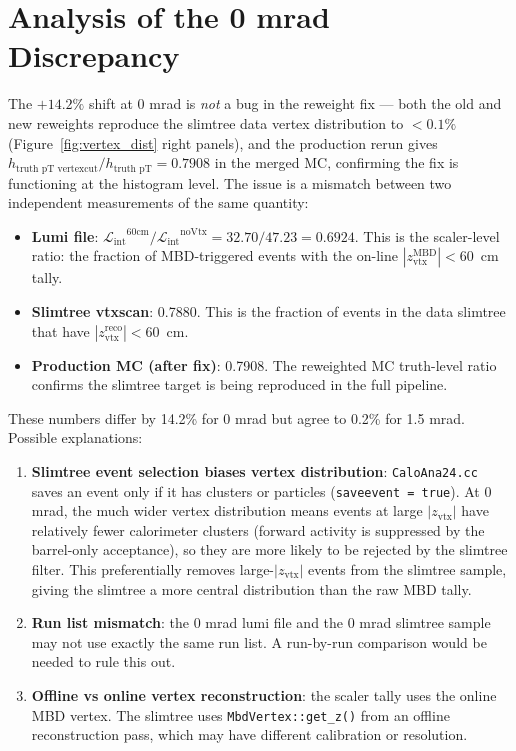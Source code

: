 \documentclass[11pt,letterpaper]{article}
\newcommand{\zvtx}{\ensuremath{z_{\mathrm{vtx}}}}
\newcommand{\Lint}{\ensuremath{\mathcal{L}_{\text{int}}}}
\begin{document}
\section{Analysis of the 0 mrad Discrepancy}
\label{sec:0mrad_discrepancy}

The $+14.2\%$ shift at 0 mrad is \emph{not} a bug in the reweight
fix --- both the old and new reweights reproduce the slimtree data
vertex distribution to $< 0.1\%$ (Figure~\ref{fig:vertex_dist} right
panels), and the production rerun gives
$h_{\text{truth pT vertexcut}}/h_{\text{truth pT}} = 0.7908$ in the
merged MC, confirming the fix is functioning at the histogram level.
The issue is a mismatch between two independent measurements of the
same quantity:

\begin{itemize}
  \item \textbf{Lumi file}: $\Lint^{60\text{cm}} / \Lint^{\text{noVtx}}
    = 32.70 / 47.23 = 0.6924$. This is the scaler-level ratio: the
    fraction of MBD-triggered events with the on-line
    $|z^{\text{MBD}}_{\text{vtx}}| < 60$~cm tally.
  \item \textbf{Slimtree vtxscan}: 0.7880. This is the fraction of
    events in the data slimtree that have
    $|z^{\text{reco}}_{\text{vtx}}| < 60$~cm.
  \item \textbf{Production MC (after fix)}: 0.7908. The reweighted
    MC truth-level ratio confirms the slimtree target is being
    reproduced in the full pipeline.
\end{itemize}

These numbers differ by 14.2\% for 0 mrad but agree to 0.2\% for
1.5 mrad. Possible explanations:

\begin{enumerate}
  \item \textbf{Slimtree event selection biases vertex distribution}:
    \texttt{CaloAna24.cc} saves an event only if it has clusters or
    particles (\texttt{saveevent = true}). At 0 mrad, the much wider
    vertex distribution means events at large $|\zvtx|$ have
    relatively fewer calorimeter clusters (forward activity is
    suppressed by the barrel-only acceptance), so they are more
    likely to be rejected by the slimtree filter. This preferentially
    removes large-$|\zvtx|$ events from the slimtree sample, giving
    the slimtree a more central distribution than the raw MBD tally.
  \item \textbf{Run list mismatch}: the 0 mrad lumi file and the
    0 mrad slimtree sample may not use exactly the same run list.
    A run-by-run comparison would be needed to rule this out.
  \item \textbf{Offline vs online vertex reconstruction}: the
    scaler tally uses the online MBD vertex. The slimtree uses
    \texttt{MbdVertex::get\_z()} from an offline reconstruction pass,
    which may have different calibration or resolution.
\end{enumerate}
\end{document}

